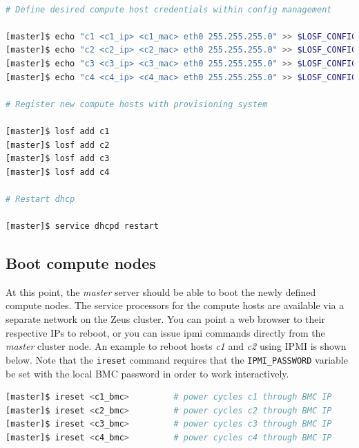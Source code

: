 \documentclass[letterpaper]{article}
\begin{document}
\begin{lstlisting}[language=bash,keywords={},upquote=true,basicstyle=\footnotesize\ttfamily]

# Define desired compute host credentials within config management

[master]$ echo "c1 <c1_ip> <c1_mac> eth0 255.255.255.0" >> $LOSF_CONFIG_DIR/ips.cluster
[master]$ echo "c2 <c2_ip> <c2_mac> eth0 255.255.255.0" >> $LOSF_CONFIG_DIR/ips.cluster
[master]$ echo "c3 <c3_ip> <c3_mac> eth0 255.255.255.0" >> $LOSF_CONFIG_DIR/ips.cluster
[master]$ echo "c4 <c4_ip> <c4_mac> eth0 255.255.255.0" >> $LOSF_CONFIG_DIR/ips.cluster

# Register new compute hosts with provisioning system

[master]$ losf add c1
[master]$ losf add c2
[master]$ losf add c3
[master]$ losf add c4

# Restart dhcp 

[master]$ service dhcpd restart

\end{lstlisting}



\subsection{Boot compute nodes}

At this point, the {\em master} server should be able to boot the newly defined
compute nodes.  The service processors for the compute hosts are available via
a separate network on the Zeus cluster. You can point a web browser to their
respective IPs to reboot, or you can issue ipmi commands directly from the {\em
  master} cluster node.  An example to reboot hosts {\em c1} and {\em c2} using
IPMI is shown below.  Note that the \texttt{ireset} command requires that the
\texttt{IPMI\_PASSWORD} variable be set with the local BMC password in order to
work interactively.

\vspace*{0.2cm}


\begin{lstlisting}[language=bash,keywords={},upquote=true]
[master]$ ireset <c1_bmc>         # power cycles c1 through BMC IP
[master]$ ireset <c2_bmc>         # power cycles c2 through BMC IP
[master]$ ireset <c3_bmc>         # power cycles c3 through BMC IP
[master]$ ireset <c4_bmc>         # power cycles c4 through BMC IP
\end{lstlisting} 
\end{document}
